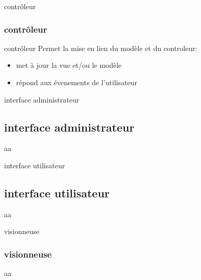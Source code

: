 \documentclass{beamer}
\begin{document}
\begin{frame}{contrôleur}
   \subsubsection{contrôleur}
	\begin{block}{contrôleur}
	Permet la mise en lien du modèle et du controleur:
		\begin{itemize}
			\item met à jour la vue et/ou le modèle
			\item répond aux évenements de l'utilisateur
		\end{itemize}
	\end{block}
			
\end{frame}


\begin{frame}{interface administrateur}
  \subsection {interface administrateur}
	\begin{block}
		aa
	\end{block}
\end{frame}


\begin{frame}{interface utilisateur}
  \subsection {interface utilisateur}
	\begin{block}
		aa
	\end{block}
\end{frame}

\begin{frame}{visionneuse}
  \subsubsection {visionneuse}
	\begin{block}
		aa
	\end{block}
\end{frame}
\end{document}
